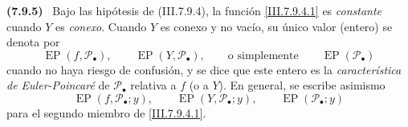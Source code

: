 \documentclass[10pt,oneside]{book}
\newcommand{\sref}[2][]{\textup{(#2)}}
\newenvironment{env}[1][]{\par\medskip\noindent\textbf{(#1)}\ }{\par}
\begin{document}
\begin{env}[7.9.5]
\label{III.7.9.5}
Bajo las hipótesis de \sref{III.7.9.4}, la función
\eqref{III.7.9.4.1} es \emph{constante} cuando $Y$ es
\emph{conexo}. Cuando $Y$ es conexo y no vacío, su único valor
(entero) se denota por
\[
  \operatorname{EP}(f,\mathscr P_\bullet),\qquad
  \operatorname{EP}(Y,\mathscr P_\bullet),
  \qquad\text{o simplemente}\qquad
  \operatorname{EP}(\mathscr P_\bullet)
\]
cuando no haya riesgo de confusión, y se dice que este entero es la
\emph{característica de Euler-Poincaré} de $\mathscr P_\bullet$
relativa a $f$ (o a $Y$). En general, se escribe asimismo
\[
  \operatorname{EP}(f,\mathscr P_\bullet;y),\qquad
  \operatorname{EP}(Y,\mathscr P_\bullet;y),\qquad
  \operatorname{EP}(\mathscr P_\bullet;y)
\]
para el segundo miembro de \eqref{III.7.9.4.1}.
\end{env}
\end{document}
